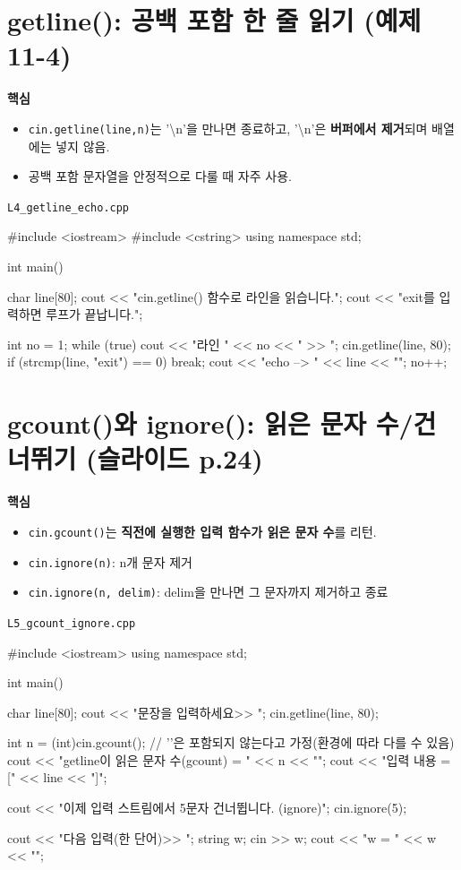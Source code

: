 \documentclass[11pt,a4paper]{article}
\newcommand{\filetag}[1]{\texttt{\color{Accent}#1}}
\begin{document}
\section{getline(): 공백 포함 한 줄 읽기 (예제 11-4)}
\begin{GoalBox}
\textbf{핵심}
\begin{itemize}[leftmargin=18pt]
  \item \texttt{cin.getline(line,n)}는 '\textbackslash n'을 만나면 종료하고, '\textbackslash n'은 \textbf{버퍼에서 제거}되며 배열에는 넣지 않음. %
  \item 공백 포함 문자열을 안정적으로 다룰 때 자주 사용.
\end{itemize}
\end{GoalBox}

\noindent\filetag{L4\_getline\_echo.cpp}
\begin{cppcode}
#include <iostream>
#include <cstring>
using namespace std;

int main() {
    char line[80];
    cout << "cin.getline() 함수로 라인을 읽습니다.\n";
    cout << "exit를 입력하면 루프가 끝납니다.\n";

    int no = 1;
    while (true) {
        cout << "라인 " << no << " >> ";
        cin.getline(line, 80);
        if (strcmp(line, "exit") == 0) break;
        cout << "echo --> " << line << "\n";
        no++;
    }
}
\end{cppcode}

\section{gcount()와 ignore(): 읽은 문자 수/건너뛰기 (슬라이드 p.24)}
\begin{GoalBox}
\textbf{핵심}
\begin{itemize}[leftmargin=18pt]
  \item \texttt{cin.gcount()}는 \textbf{직전에 실행한 입력 함수가 읽은 문자 수}를 리턴. %
  \item \texttt{cin.ignore(n)}: n개 문자 제거
  \item \texttt{cin.ignore(n, delim)}: delim을 만나면 그 문자까지 제거하고 종료
\end{itemize}
\end{GoalBox}

\noindent\filetag{L5\_gcount\_ignore.cpp}
\begin{cppcode}
#include <iostream>
using namespace std;

int main() {
    char line[80];
    cout << "문장을 입력하세요>> ";
    cin.getline(line, 80);

    int n = (int)cin.gcount(); // '\0'은 포함되지 않는다고 가정(환경에 따라 다를 수 있음)
    cout << "getline이 읽은 문자 수(gcount) = " << n << "\n";
    cout << "입력 내용 = [" << line << "]\n";

    cout << "이제 입력 스트림에서 5문자 건너뜁니다. (ignore)\n";
    cin.ignore(5);

    cout << "다음 입력(한 단어)>> ";
    string w;
    cin >> w;
    cout << "w = " << w << "\n";
}
\end{cppcode}
\end{document}
